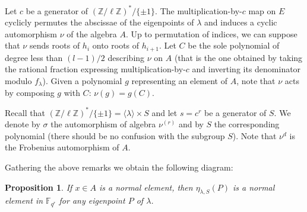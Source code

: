 \documentclass[12pt]{article}
\theoremstyle{plain}
\newtheorem{proposition}[theorem]{Proposition}
\theoremstyle{definition}
\def\Z{\ensuremath{\mathbb{Z}}}
\def\F{\ensuremath{\mathbb{F}}}
\begin{document}
Let $c$ be a generator of $(\Z/\ell\Z)^{\ast}/\{\pm 1\}$.
The multiplication-by-$c$ map on $E$ cyclicly permutes the
abscissae of the eigenpoints of $\lambda$ and
induces a cyclic automorphism $\nu$ of the algebra $A$.
Up to permutation of indices, we can suppose that $\nu$
sends roots of $h_i$ onto roots of $h_{i+1}$.
Let $C$ be the sole polynomial of degree less than $(l-1)/2$
describing $\nu$ on $A$ (that is the one obtained by taking the
rational fraction expressing multiplication-by-$c$ and inverting
its denominator modulo $f_\lambda$).
Given a polynomial $g$ representing an element of $A$, note that
$\nu$ acts by composing $g$ with $C$: $\nu(g) = g(C)$.

Recall that
$(\Z/\ell\Z)^{\ast}/\{\pm 1\} = \langle{\lambda}\rangle \times S$
and let $s = c^r$ be a generator of $S$.
We denote by $\sigma$ the automorphism of algebra $\nu^{(r)}$
and by $S$ the corresponding polynomial
(there should be no confusion with the subgroup $S$).
Note that $\nu^d$ is the Frobenius automorphism of $A$.

Gathering the above remarks we obtain the following diagram:
\begin{center}
\end{center}

\begin{proposition}
\label{prop:xnormal}
If $x \in A$ is a normal element,
then $\eta_{\lambda,S}(P)$ is a normal element in $\F_{q^r}$
for any eigenpoint $P$ of $\lambda$.
\end{proposition}
\end{document}

